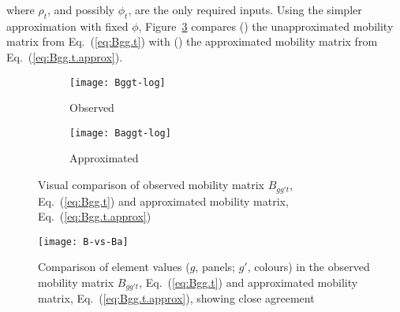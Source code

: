 where $\rho_{t}$, and possibly $\phi_{t}$, are the only required inputs.
Using the simpler approximation with fixed $\phi$, Figure~\ref{fig:Bggt}
compares () the unapproximated mobility matrix from Eq.~(\ref{eq:Bgg.t})
with () the approximated mobility matrix from Eq.~(\ref{eq:Bgg.t.approx}).
\begin{figure}[ht]
  \begin{subfigure}{\linewidth}
    \texttt{[image: Bggt-log]}
    \caption{Observed}
    \label{fig:Bggt-orig}
  \end{subfigure}
  \begin{subfigure}{\linewidth}
    \texttt{[image: Baggt-log]}
    \caption{Approximated}
    \label{fig:Bggt-approx}
  \end{subfigure}
  \caption{Visual comparison of
    observed mobility matrix $B_{gg't}$, Eq.~(\ref{eq:Bgg.t}) and
    approximated mobility matrix, Eq.~(\ref{eq:Bgg.t.approx})}
  \label{fig:Bggt}
\end{figure}
\begin{figure}[ht]
  \centering
  \texttt{[image: B-vs-Ba]}
  \caption{Comparison of element values ($g$, panels; $g'$, colours) in the  %
    observed mobility matrix $B_{gg't}$, Eq.~(\ref{eq:Bgg.t}) and
    approximated mobility matrix, Eq.~(\ref{eq:Bgg.t.approx}),
    showing close agreement}
  \label{fig:B.vs.Ba}
\end{figure}
\clearpage
